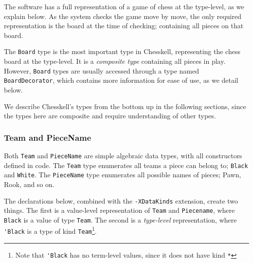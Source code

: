 \documentclass[12pt, a4paper, bibliography=totocnumbered]{scrartcl}
\begin{document}
The software has a full representation of a game of chess at the type-level, as we explain below. As the system checks the game move by move, the only required representation is the board at the time of checking; containing all pieces on that board.

The \lstinline[basicstyle=\ttfamily]{Board} type is the most important type in Chesskell, representing the chess board at the type-level. It is a \emph{composite type} containing all pieces in play. However, \lstinline[basicstyle=\ttfamily]{Board} types are usually accessed through a type named \lstinline[basicstyle=\ttfamily]{BoardDecorator}, which contains more information for ease of use, as we detail below.

We describe Chesskell's types from the bottom up in the following sections, since the types here are composite and require understanding of other types.

\subsubsection{Team and PieceName}

Both \lstinline[basicstyle=\ttfamily]{Team} and \lstinline[basicstyle=\ttfamily]{PieceName} are simple algebraic data types, with all constructors defined in code. The \lstinline[basicstyle=\ttfamily]{Team} type enumerates all teams a piece can belong to; \lstinline[basicstyle=\ttfamily]{Black} and \lstinline[basicstyle=\ttfamily]{White}. The \lstinline[basicstyle=\ttfamily]{PieceName} type enumerates all possible names of pieces; Pawn, Rook, and so on.

The declarations below, combined with the \lstinline[basicstyle=\ttfamily]{-XDataKinds} extension, create two things. The first is a value-level representation of \lstinline[basicstyle=\ttfamily]{Team} and \lstinline[basicstyle=\ttfamily]{Piecename}, where \lstinline[basicstyle=\ttfamily]{Black} is a value of type \lstinline[basicstyle=\ttfamily]{Team}. The second is a \emph{type-level} representation, where \lstinline[basicstyle=\ttfamily]{'Black} is a type of kind \lstinline[basicstyle=\ttfamily]{Team}\footnote{Note that \lstinline[basicstyle=\ttfamily]{'Black} has no term-level values, since it does not have kind \lstinline[basicstyle=\ttfamily]{*}}.

\end{document}
